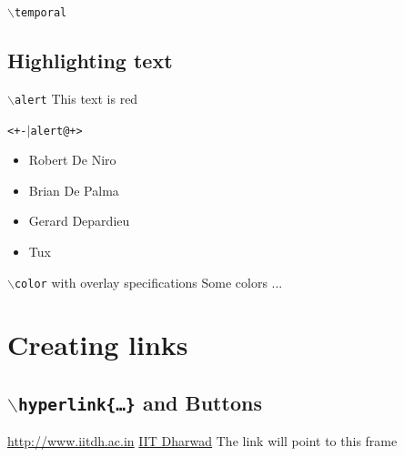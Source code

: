 \documentclass{beamer}
\begin{document}
\begin{frame}{\texttt{$\backslash$temporal}}
\end{frame}

\subsection{Highlighting text}

\begin{frame}{\texttt{$\backslash$alert}}
\alert<1>{This text} \alert<2>{is} \alert<3>{red}
\end{frame}

\begin{frame}{\texttt{\textless+-$\vert$alert@+\textgreater}}
\begin{itemize}
\item <+-| alert@+> Robert De Niro
\item <+-| alert@+> Brian De Palma
\item <+-| alert@+> Gerard Depardieu
\item <+-| alert@+> Tux
\end{itemize}
\end{frame}

\begin{frame}{\texttt{$\backslash$color} with overlay specifications}
Some colors ...\\
\end{frame}

\section[Hyperlinks]{Creating links}
\subsection{\texttt{$\backslash$hyperlink\{\ldots\}} and Buttons}
\begin{frame}[label=MY_LABEL]
\url{http://www.iitdh.ac.in}
\vfill
\href{http://www.iitdh.ac.in}{IIT Dharwad}
\vfill
The link will point to this frame
\end{frame}
\end{document}
